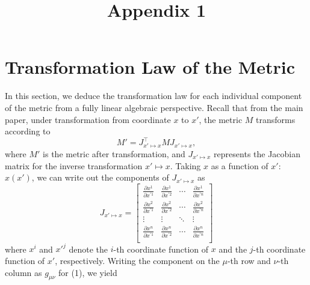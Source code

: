 \documentclass{article}
\date{}
\title{Appendix 1}
\begin{document}
\maketitle

\section{Transformation Law of the Metric} 

In this section, we deduce the transformation law for each 
individual component of the metric from a fully linear algebraic 
perspective. Recall that from the main paper, under transformation 
from coordinate $x$ to $x'$, the metric $M$ transforms according to 
\[
M' = J_{x' \mapsto x}^\top M J_{x' \mapsto x},
\tag{1}
\]
where $M'$ is the metric after transformation, and $J_{x' \mapsto x}$ 
represents the Jacobian matrix for the inverse transformation $x' \mapsto x$.
Taking $x$ as a function of $x'$: $x(x')$, we can write out the components 
of $J_{x' \mapsto x}$ as
\[
J_{x' \mapsto x} =
\begin{bmatrix}
\frac{\partial x^1}{\partial x^{\prime 1}} & \frac{\partial x^1}{\partial x^{\prime 2}} & \cdots & \frac{\partial x^1}{\partial x^{\prime n}} \\
\frac{\partial x^2}{\partial x^{\prime 1}} & \frac{\partial x^2}{\partial x^{\prime 2}} & \cdots & \frac{\partial x^2}{\partial x^{\prime n}} \\
\vdots & \vdots & \ddots & \vdots \\
\frac{\partial x^n}{\partial x^{\prime 1}} & \frac{\partial x^n}{\partial x^{\prime 2}} & \cdots & \frac{\partial x^n}{\partial x^{\prime n}} \\
\end{bmatrix}
\]
where $x^i$ and $x'^j$ denote the $i$-th coordinate function of $x$ and 
the $j$-th coordinate function of $x'$, respectively. Writing the component on the 
$\mu$-th row and $\nu$-th column as $g_{\mu\nu}$ for (1), we yield
\end{document}
